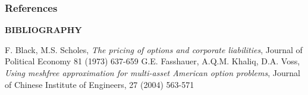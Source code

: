 \documentclass[hyperref={pdfpagelabels=false}]{beamer}
\begin{document}
\begin{frame}
	{\footnotesize
		
		
	}
\end{frame}

\begin{frame}[allowframebreaks]
	\frametitle{References}
	
	
	\begin{center}
		{\bf BIBLIOGRAPHY}
	\end{center}
	\begin{thebiblio}{}
		
		
		
		F. Black, M.S. Scholes, \emph{The pricing of options and corporate
			liabilities}, Journal of Political Economy 81 (1973) 637-659
		G.E. Fasshauer, A.Q.M. Khaliq, D.A. Voss, \emph{Using meshfree
			approximation for multi-asset American option problems}, Journal of
		Chinese Institute of Engineers, 27 (2004) 563-571
		

\end{thebiblio}
\end{frame}
\end{document}
